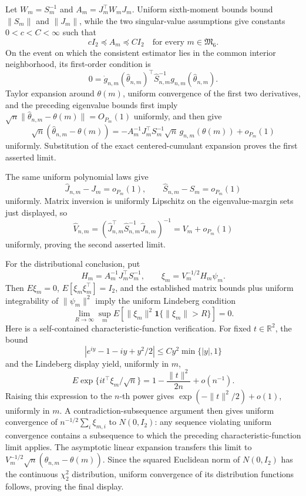 Let \(W_m=S_m^{-1}\) and \(A_m=J_m^\top W_mJ_m\). Uniform sixth-moment bounds bound \(\|S_m\|\) and \(\|J_m\|\), while the two singular-value assumptions give constants \(0<c<C<\infty\) such that
\[
cI_2\preceq A_m\preceq CI_2
\quad\text{for every }m\in\mathfrak M_6.
\]
On the event on which the consistent estimator lies in the common interior neighborhood, its first-order condition is
\[
0=\dot g_{n,m}(\widehat\theta_{n,m})^\top
\widehat S_{n,m}^{-1}g_{n,m}(\widehat\theta_{n,m}).
\]
Taylor expansion around \(\theta(m)\), uniform convergence of the first two derivatives, and the preceding eigenvalue bounds first imply
\(\sqrt n\|\widehat\theta_{n,m}-\theta(m)\|=O_{P_m}(1)\) uniformly, and then give
\[
\sqrt n(\widehat\theta_{n,m}-\theta(m))
=-A_m^{-1}J_m^\top S_m^{-1}\sqrt n\,g_{n,m}(\theta(m))+o_{P_m}(1)
\]
uniformly. Substitution of the exact centered-cumulant expansion proves the first asserted limit.

The same uniform polynomial laws give
\[
\widehat J_{n,m}-J_m=o_{P_m}(1),
\qquad
\widehat S_{n,m}-S_m=o_{P_m}(1)
\]
uniformly. Matrix inversion is uniformly Lipschitz on the eigenvalue-margin sets just displayed, so
\[
\widehat V_{n,m}
=(\widehat J_{n,m}^\top\widehat S_{n,m}^{-1}\widehat J_{n,m})^{-1}
=V_m+o_{P_m}(1)
\]
uniformly, proving the second asserted limit.

For the distributional conclusion, put
\[
H_m=A_m^{-1}J_m^\top S_m^{-1},
\qquad
\xi_m=V_m^{-1/2}H_m\psi_m.
\]
Then \(E\xi_m=0\), \(E[\xi_m\xi_m^\top]=I_2\), and the established matrix bounds plus uniform integrability of \(\|\psi_m\|^2\) imply the uniform Lindeberg condition
\[
\lim_{R\to\infty}\sup_mE[\|\xi_m\|^2\mathbf1\{\|\xi_m\|>R\}]=0.
\]
Here is a self-contained characteristic-function verification. For fixed \(t\in\mathbb R^2\), the bound
\[
|e^{iy}-1-iy+y^2/2|\le C y^2\min\{|y|,1\}
\]
and the Lindeberg display yield, uniformly in \(m\),
\[
E\exp\{it^\top\xi_m/\sqrt n\}
=1-\frac{\|t\|^2}{2n}+o(n^{-1}).
\]
Raising this expression to the \(n\)-th power gives \(\exp(-\|t\|^2/2)+o(1)\), uniformly in \(m\). A contradiction-subsequence argument then gives uniform convergence of \(n^{-1/2}\sum_i\xi_{m,i}\) to \(N(0,I_2)\): any sequence violating uniform convergence contains a subsequence to which the preceding characteristic-function limit applies. The asymptotic linear expansion transfers this limit to \(V_m^{-1/2}\sqrt n(\widehat\theta_{n,m}-\theta(m))\). Since the squared Euclidean norm of \(N(0,I_2)\) has the continuous \(\chi^2_2\) distribution, uniform convergence of its distribution functions follows, proving the final display.

